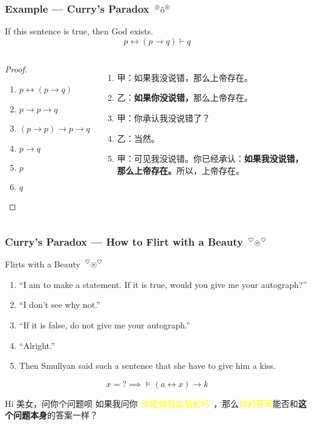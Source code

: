 \documentclass[UTF8,11pt,colorlinks,compress,openany]{beamer}%
\begin{document}
\begin{frame}\frametitle{Example --- Curry's Paradox $\sideset{^\circledcirc}{^\circledcirc}{\operatorname{\hat{o}}}$}
	\begin{block}{If this sentence is true, then God exists.}
		\[p\leftrightarrow(p\to q)\vdash q\]
	\end{block}
\begin{columns}
	\begin{proof}
		\begin{enumerate}
			\item $p\leftrightarrow(p\to q)$
			\item $p\to p\to q$
			\item $(p\to p)\to p\to q$
			\item $p\to q$
			\item $p$
			\item $q$
		\end{enumerate}
	\end{proof}
\begin{enumerate}
	\item 甲：如果我没说错，那么上帝存在。
	\item 乙：\textbf{如果你没说错，}那么上帝存在。
	\item 甲：你承认我没说错了？
	\item 乙：当然。
	\item 甲：可见我没说错。你已经承认：\textbf{如果我没说错，那么上帝存在。}所以，上帝存在。
\end{enumerate}
\end{columns}\centering
\fbox{\textcolor{red}{This sentence is false, and God does not exist.}}
\end{frame}

\begin{frame}\frametitle{Curry's Paradox --- How to Flirt with a Beauty $\sideset{^\heartsuit}{^\heartsuit}{\operatorname{\circledcirc}}$}
	\begin{block}{\hyperlink{smullyan-boole}{}\label{smullyan-curry} Flirts with a Beauty $\sideset{^\heartsuit}{^\heartsuit}{\operatorname{\circledcirc}}$}
	\begin{enumerate}\small
		\item ``I am to make a statement. If it is true, would you give me your autograph?''
		\item ``I don't see why not.''
		\item ``If it is false, do not give me your autograph.''
		\item ``Alright.''
		\item Then Smullyan said such a sentence that she have to give him a kiss.
	\end{enumerate}
	\end{block}
\[x=?\implies\vDash(a\leftrightarrow x)\to k\]
\begin{block}{Hi 美女，问你个问题呗}
如果我问你\textcolor{yellow}{“你能做我女朋友吗”}，那么\textcolor{yellow}{你的答案}能否和\textbf{这个问题本身}的答案一样？
\end{block}
\end{frame}
\end{document}

